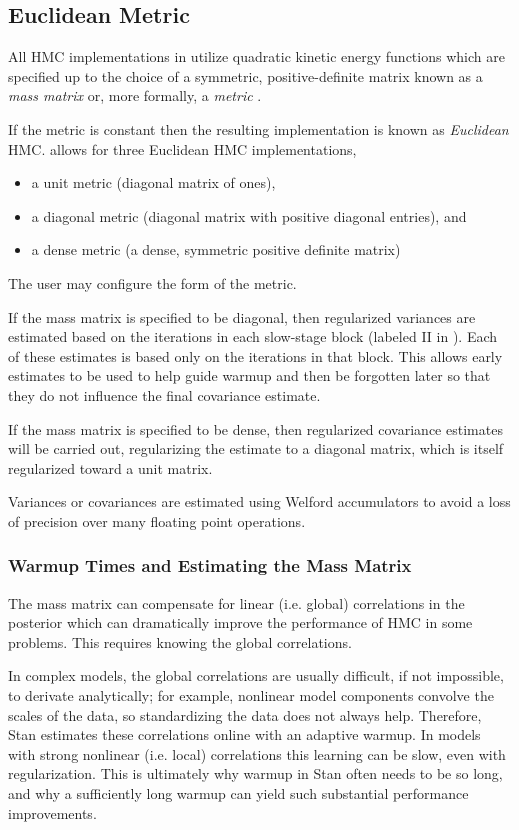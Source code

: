 \subsection{Euclidean Metric}

All HMC implementations in \Stan utilize quadratic kinetic energy
functions which are specified up to the choice of a symmetric,
positive-definite matrix known as a \textit{mass matrix} or, more
formally, a \textit{metric} \citep{Betancourt-Stein:2011}.

If the metric is constant then the resulting implementation is known
as \textit{Euclidean} HMC.  \Stan allows for three Euclidean HMC
implementations,
%
\begin{itemize}
\item a unit metric (diagonal matrix of ones),
\item a diagonal metric (diagonal matrix with positive diagonal
  entries), and
\item a dense metric (a dense, symmetric positive definite matrix)
\end{itemize}
%
The user may configure the form of the metric.

If the mass matrix is specified to be diagonal, then regularized
variances are estimated based on the iterations in each slow-stage
block (labeled II in ).  Each of these estimates
is based only on the iterations in that block.  This allows early
estimates to be used to help guide warmup and then be forgotten later
so that they do not influence the final covariance estimate.

If the mass matrix is specified to be dense, then regularized
covariance estimates will be carried out, regularizing the estimate to
a diagonal matrix, which is itself regularized toward a unit matrix.

Variances or covariances are estimated using Welford accumulators
to avoid a loss of precision over many floating point operations.

\subsubsection{Warmup Times and Estimating the Mass Matrix}

The mass matrix can compensate for linear (i.e. global) correlations
in the posterior which can dramatically improve the performance of HMC
in some problems. This requires knowing the global correlations.

In complex models, the global correlations are usually difficult, if
not impossible, to derivate analytically; for example, nonlinear model
components convolve the scales of the data, so standardizing the data
does not always help.  Therefore, Stan estimates these correlations
online with an adaptive warmup.  In models with strong nonlinear
(i.e. local) correlations this learning can be slow, even with
regularization. This is ultimately why warmup in Stan often needs to
be so long, and why a sufficiently long warmup can yield such
substantial performance improvements.

